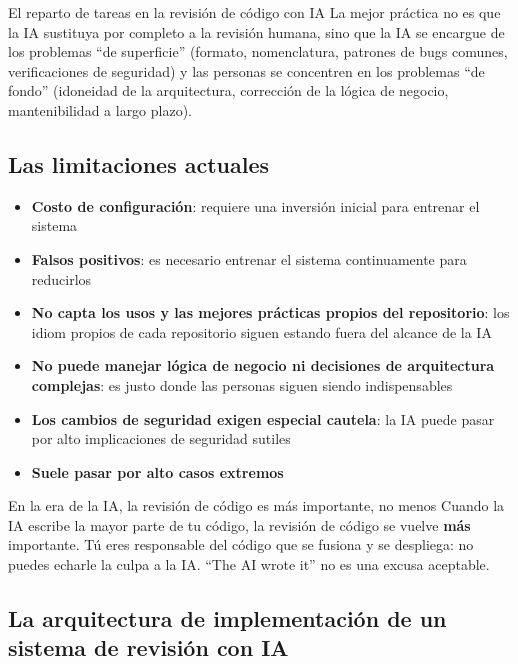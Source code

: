 \documentclass[a4paper]{article}
\begin{document}
\begin{knowledgebox}{El reparto de tareas en la revisión de código con IA}
La mejor práctica no es que la IA sustituya por completo a la revisión humana, sino que la IA se encargue de los problemas ``de superficie'' (formato, nomenclatura, patrones de bugs comunes, verificaciones de seguridad) y las personas se concentren en los problemas ``de fondo'' (idoneidad de la arquitectura, corrección de la lógica de negocio, mantenibilidad a largo plazo).
\end{knowledgebox}

\subsection{Las limitaciones actuales}

\begin{itemize}
    \item \textbf{Costo de configuración}: requiere una inversión inicial para entrenar el sistema
    \item \textbf{Falsos positivos}: es necesario entrenar el sistema continuamente para reducirlos
    \item \textbf{No capta los usos y las mejores prácticas propios del repositorio}: los idiom propios de cada repositorio siguen estando fuera del alcance de la IA
    \item \textbf{No puede manejar lógica de negocio ni decisiones de arquitectura complejas}: es justo donde las personas siguen siendo indispensables
    \item \textbf{Los cambios de seguridad exigen especial cautela}: la IA puede pasar por alto implicaciones de seguridad sutiles
    \item \textbf{Suele pasar por alto casos extremos}
\end{itemize}

\begin{warningbox}{En la era de la IA, la revisión de código es más importante, no menos}
Cuando la IA escribe la mayor parte de tu código, la revisión de código se vuelve \textbf{más} importante. Tú eres responsable del código que se fusiona y se despliega: no puedes echarle la culpa a la IA. ``The AI wrote it'' no es una excusa aceptable.
\end{warningbox}

\subsection{La arquitectura de implementación de un sistema de revisión con IA}
\end{document}
